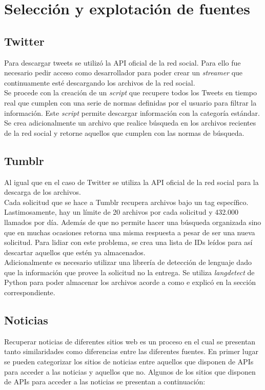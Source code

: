 \section{Selección y explotación de fuentes}

\subsection{Twitter}
Para descargar tweets se utilizó la API oficial de la red social. Para ello fue necesario pedir acceso como desarrollador para poder crear un \textit{streamer} que continuamente esté descargando los archivos de la red social.\\ 

Se procede con la creación de un \textit{script} que recupere todos los Tweets en tiempo real que cumplen con una serie de normas definidas por el usuario para filtrar la información. Este \textit{script} permite descargar información con la categoría estándar. Se crea adicionalmente un archivo que realice búsqueda en los archivos recientes de la red social y retorne aquellos que cumplen con las normas de búsqueda.

\subsection{Tumblr}
Al igual que en el caso de Twitter se utiliza la API oficial de la red social para la descarga de los archivos.\\

Cada solicitud que se hace a Tumblr recupera archivos bajo un tag específico. Lastimosamente, hay un límite de 20 archivos por cada solicitud y 432.000 llamados por día. Además de que no permite hacer una búsqueda organizada sino que en muchas ocasiones retorna una misma respuesta a pesar de ser una nueva solicitud. Para lidiar con este problema, se crea una lista de IDs leídos para así descartar aquellos que estén ya almacenados.\\ 

Adicionalmente es necesario utilizar una librería de detección de lenguaje dado que la información que provee la solicitud no la entrega. Se utiliza \textit{langdetect} de Python para poder almacenar los archivos acorde a como e explicó en la sección correspondiente.

\subsection{Noticias}
Recuperar noticias de diferentes sitios web es un proceso en el cual se presentan tanto similaridades como diferencias entre las diferentes fuentes. En primer lugar se pueden categorizar los sitios de noticias entre aquellos que disponen de APIs para acceder a las noticias y aquellos que no. Algunos de los sitios que disponen de APIs para acceder a las noticias se presentan a continuación:


